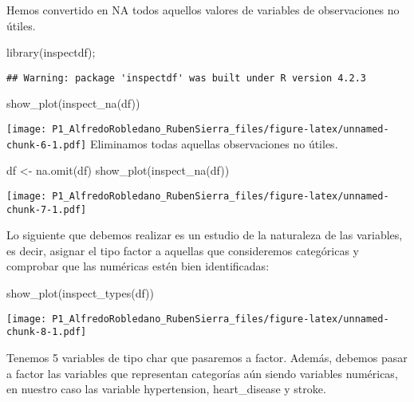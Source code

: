 \documentclass[
]{article}
\newenvironment{Shaded}{\begin{snugshade}}{\end{snugshade}}
\newcommand{\FunctionTok}[1]{\textcolor[rgb]{0.00,0.00,0.00}{#1}}
\newcommand{\NormalTok}[1]{#1}
\newcommand{\OtherTok}[1]{\textcolor[rgb]{0.56,0.35,0.01}{#1}}
\begin{document}
Hemos convertido en NA todos aquellos valores de variables de
observaciones no útiles.

\begin{Shaded}
\begin{Highlighting}[]
\FunctionTok{library}\NormalTok{(inspectdf);}
\end{Highlighting}
\end{Shaded}

\begin{verbatim}
## Warning: package 'inspectdf' was built under R version 4.2.3
\end{verbatim}

\begin{Shaded}
\begin{Highlighting}[]
\FunctionTok{show\_plot}\NormalTok{(}\FunctionTok{inspect\_na}\NormalTok{(df))}
\end{Highlighting}
\end{Shaded}

\texttt{[image: P1\_AlfredoRobledano\_RubenSierra\_files/figure-latex/unnamed-chunk-6-1.pdf]}
Eliminamos todas aquellas observaciones no útiles.

\begin{Shaded}
\begin{Highlighting}[]
\NormalTok{df }\OtherTok{\textless{}{-}} \FunctionTok{na.omit}\NormalTok{(df)}
\FunctionTok{show\_plot}\NormalTok{(}\FunctionTok{inspect\_na}\NormalTok{(df))}
\end{Highlighting}
\end{Shaded}

\texttt{[image: P1\_AlfredoRobledano\_RubenSierra\_files/figure-latex/unnamed-chunk-7-1.pdf]}

Lo siguiente que debemos realizar es un estudio de la naturaleza de las
variables, es decir, asignar el tipo factor a aquellas que consideremos
categóricas y comprobar que las numéricas estén bien identificadas:

\begin{Shaded}
\begin{Highlighting}[]
\FunctionTok{show\_plot}\NormalTok{(}\FunctionTok{inspect\_types}\NormalTok{(df))}
\end{Highlighting}
\end{Shaded}

\texttt{[image: P1\_AlfredoRobledano\_RubenSierra\_files/figure-latex/unnamed-chunk-8-1.pdf]}

Tenemos 5 variables de tipo char que pasaremos a factor. Además, debemos
pasar a factor las variables que representan categorías aún siendo
variables numéricas, en nuestro caso las variable hypertension,
heart\_disease y stroke.
\end{document}
